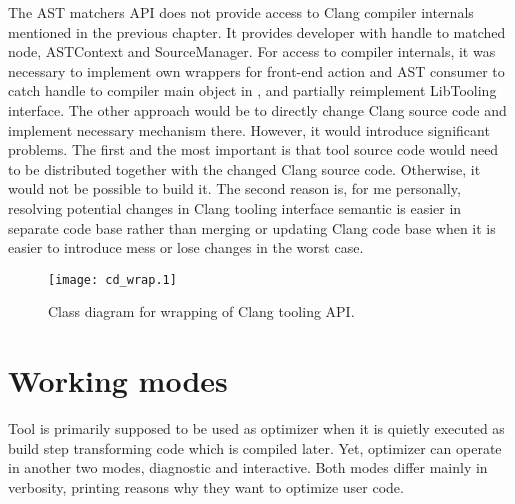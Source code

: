 The AST matchers API does not provide access to Clang compiler internals mentioned in the previous chapter. It provides developer with handle to matched node, ASTContext and SourceManager. For access to compiler internals, it was necessary to implement own wrappers for front-end action and AST consumer to catch handle to compiler main object in , and partially reimplement LibTooling interface. The other approach would be to directly change Clang source code and implement necessary mechanism there. However, it would introduce significant problems. The first and the most important is that tool source code would need to be distributed together with the changed Clang source code. Otherwise, it would not be possible to build it. The second reason is, for me personally, resolving potential changes in Clang tooling interface semantic is easier in separate code base rather than merging or updating Clang code base when it is easier to introduce mess or lose changes in the worst case.

\begin{figure}[h!]
	\caption{Class diagram for wrapping of Clang tooling API.}
	\vspace{0.5cm}
	\centering
		\texttt{[image: cd\_wrap.1]}
\end{figure}

\section{Working modes}
Tool is primarily supposed to be used as optimizer when it is quietly executed as build step transforming code which is compiled later. Yet, optimizer can operate in another two modes, diagnostic and interactive. Both modes differ mainly in verbosity, printing reasons why they want to optimize user code.

